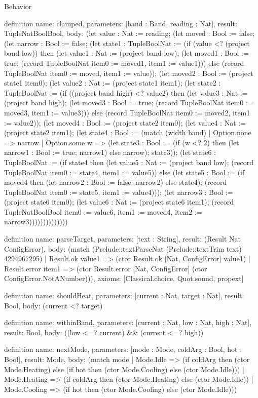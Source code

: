 \begin{lexlean}{Behavior}
\begin{semanticmodule}
definition{
  name: clamped,
  parameters: [band : Band, reading : Nat],
  result: TupleNatBoolBool,
  body: (let value : Nat := reading; (let moved : Bool := false; (let narrow : Bool := false; (let state1 : TupleBoolNat := (if (value <? (project band low)) then (let value1 : Nat := (project band low); (let moved1 : Bool := true; (record TupleBoolNat {item0 := moved1, item1 := value1}))) else (record TupleBoolNat {item0 := moved, item1 := value})); (let moved2 : Bool := (project state1 item0); (let value2 : Nat := (project state1 item1); (let state2 : TupleBoolNat := (if ((project band high) <? value2) then (let value3 : Nat := (project band high); (let moved3 : Bool := true; (record TupleBoolNat {item0 := moved3, item1 := value3}))) else (record TupleBoolNat {item0 := moved2, item1 := value2})); (let moved4 : Bool := (project state2 item0); (let value4 : Nat := (project state2 item1); (let state4 : Bool := (match (width band)
    | Option.none => narrow
    | Option.some w => (let state3 : Bool := (if (w <? 2) then (let narrow1 : Bool := true; narrow1) else narrow); state3)); (let state6 : TupleBoolNat := (if state4 then (let value5 : Nat := (project band low); (record TupleBoolNat {item0 := state4, item1 := value5})) else (let state5 : Bool := (if moved4 then (let narrow2 : Bool := false; narrow2) else state4); (record TupleBoolNat {item0 := state5, item1 := value4}))); (let narrow3 : Bool := (project state6 item0); (let value6 : Nat := (project state6 item1); (record TupleNatBoolBool {item0 := value6, item1 := moved4, item2 := narrow3}))))))))))))))
}

definition{
  name: parseTarget,
  parameters: [text : String],
  result: (Result Nat ConfigError),
  body: (match (Prelude::textParseNat (Prelude::textTrim text) 4294967295)
    | Result.ok value1 => (ctor Result.ok [Nat, ConfigError] value1)
    | Result.error item1 => (ctor Result.error [Nat, ConfigError] (ctor ConfigError.NotANumber))),
  axioms: [Classical.choice, Quot.sound, propext]
}

definition{
  name: shouldHeat,
  parameters: [current : Nat, target : Nat],
  result: Bool,
  body: (current <? target)
}

definition{
  name: withinBand,
  parameters: [current : Nat, low : Nat, high : Nat],
  result: Bool,
  body: ((low <=? current) && (current <=? high))
}

definition{
  name: nextMode,
  parameters: [mode : Mode, coldArg : Bool, hot : Bool],
  result: Mode,
  body: (match mode
    | Mode.Idle => (if coldArg then (ctor Mode.Heating) else (if hot then (ctor Mode.Cooling) else (ctor Mode.Idle)))
    | Mode.Heating => (if coldArg then (ctor Mode.Heating) else (ctor Mode.Idle))
    | Mode.Cooling => (if hot then (ctor Mode.Cooling) else (ctor Mode.Idle)))
}


\end{semanticmodule}
\end{lexlean}
